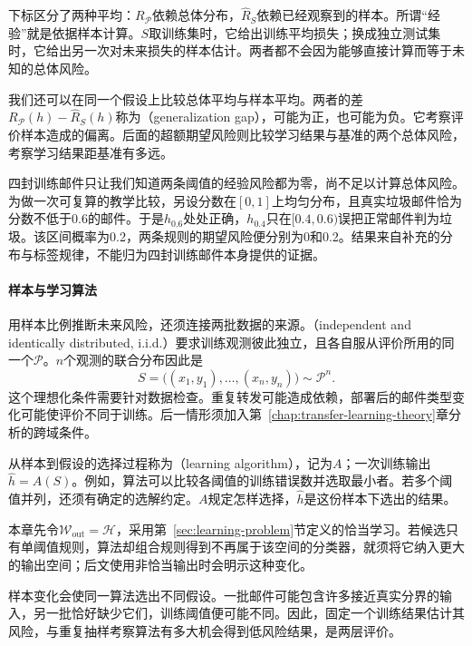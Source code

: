 下标区分了两种平均：$R_{\mathcal P}$依赖总体分布，$\hat R_S$依赖已经观察到的样本。所谓“经验”就是依据样本计算。$S$取训练集时，它给出训练平均损失；换成独立测试集时，它给出另一次对未来损失的样本估计。两者都不会因为能够直接计算而等于未知的总体风险。

我们还可以在同一个假设上比较总体平均与样本平均。两者的差$R_{\mathcal P}(h)-\hat R_S(h)$称为（generalization gap），可能为正，也可能为负。它考察评价样本造成的偏离。后面的超额期望风险则比较学习结果与基准的两个总体风险，考察学习结果距基准有多远。

四封训练邮件只让我们知道两条阈值的经验风险都为零，尚不足以计算总体风险。为做一次可复算的教学比较，另设分数在$[0,1]$上均匀分布，且真实垃圾邮件恰为分数不低于0.6的邮件。于是$h_{0.6}$处处正确，$h_{0.4}$只在$[0.4,0.6)$误把正常邮件判为垃圾。该区间概率为0.2，两条规则的期望风险便分别为0和0.2。结果来自补充的分布与标签规律，不能归为四封训练邮件本身提供的证据。

\paragraph{样本与学习算法}

用样本比例推断未来风险，还须连接两批数据的来源。（independent and identically distributed, i.i.d.）要求训练观测彼此独立，且各自服从评价所用的同一个$\mathcal P$。$n$个观测的联合分布因此是
\begin{equation}
 S=\bigl((x_1,y_1),\ldots,(x_n,y_n)\bigr)\sim\mathcal P^n.
 \label{eq:training-sample-distribution}
\end{equation}
这个理想化条件需要针对数据检查。重复转发可能造成依赖，部署后的邮件类型变化可能使评价不同于训练。后一情形须加入第~\ref{chap:transfer-learning-theory}章分析的跨域条件。

从样本到假设的选择过程称为（learning algorithm），记为$A$；一次训练输出$\hat h=A(S)$。例如，算法可以比较各阈值的训练错误数并选取最小者。若多个阈值并列，还须有确定的选解约定。$A$规定怎样选择，$\hat h$是这份样本下选出的结果。

本章先令$\mathcal W_{\mathrm{out}}=\mathcal H$，采用第~\ref{sec:learning-problem}节定义的恰当学习。若候选只有单阈值规则，算法却组合规则得到不再属于该空间的分类器，就须将它纳入更大的输出空间；后文使用非恰当输出时会明示这种变化。

样本变化会使同一算法选出不同假设。一批邮件可能包含许多接近真实分界的输入，另一批恰好缺少它们，训练阈值便可能不同。因此，固定一个训练结果估计其风险，与重复抽样考察算法有多大机会得到低风险结果，是两层评价。


